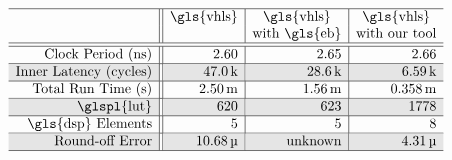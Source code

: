 \begin{table}[ht]
    \centering
    \renewcommand\arraycolsep{1.0mm}
    \newcommand\unitk{\,\text{k}}
    \newcommand\unitm{\,\text{m}}
    \newcommand\unitmu{\,\text{\textmu}}
    \newcommand\unitM{\,\text{M}}
    \newcommand\unitG{\,\text{G}}
    \newcommand\Mid[1]{\multirow{2}*{$#1$}}
    \newcommand\Shade{\cellcolor{black!10}}
    \newcommand\name[1]{\texttt{\scriptsize #1}}
    \vspace{8pt}
    $\begin{array}{r||r|r|r}
        \hline
        \multicolumn{1}{c||}{} &
        \multicolumn{1}{c|}{\text{\gls{vhls}}} &
        \multicolumn{1}{c|}{\text{\gls{vhls}}} &
        \multicolumn{1}{c}{\text{\gls{vhls}}} \\

        & &
        \multicolumn{1}{c|}{\text{with \gls{eb}}} &
        \multicolumn{1}{c}{\text{with our tool}} \\ \hline\hline

        \text{Clock Period (ns)} &
        2.60 & 2.65 & 2.66 \\ \hline

        \Shade \text{Inner Latency (cycles)} &
        \Shade 47.0\unitk & \Shade 28.6\unitk & \Shade 6.59\unitk \\ \hline

        \text{Total Run Time (s)} &
        2.50\unitm & 1.56\unitm & 0.358\unitm \\ \hline

        \Shade \text{\glspl{lut}} &
        \Shade 620 & \Shade 623 & \Shade 1778 \\ \hline

        \text{\gls{dsp} Elements} &
        5 & 5 & 8 \\ \hline

        \Shade \text{Round-off Error} &
        \Shade 10.68\unitmu &
        \Shade \text{unknown} &
        \Shade 4.31\unitmu \\ \hline
    \end{array}$
    \vspace{8pt}
    \caption{%
        Comparison among the optimized implementations generated by
        \gls{vhls}'s expression balancing and our optimizer.}
    \label{lo:tab:seidel_results}
\end{table}
